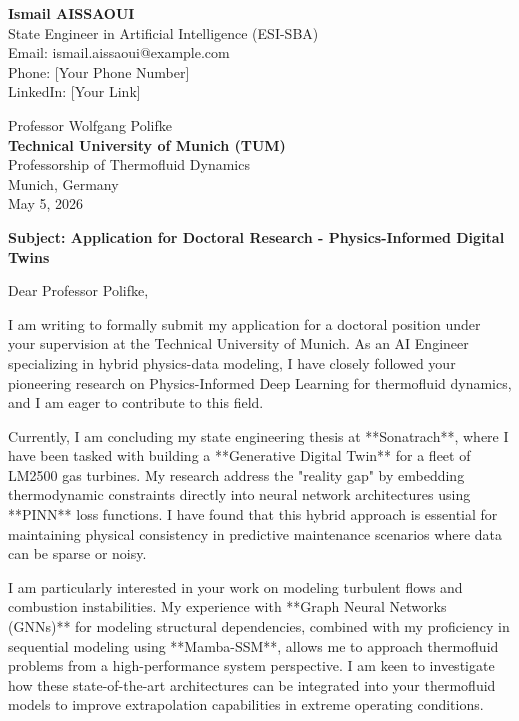 \documentclass[11pt,a4paper]{article}
\begin{document}
\noindent \textbf{Ismail AISSAOUI} \\
State Engineer in Artificial Intelligence (ESI-SBA) \\
Email: ismail.aissaoui@example.com \\
Phone: [Your Phone Number] \\
LinkedIn: [Your Link]

\bigskip

\begin{flushright}
    Professor Wolfgang Polifke \\
    \textbf{Technical University of Munich (TUM)} \\
    Professorship of Thermofluid Dynamics \\
    Munich, Germany \\
    \medskip
    May 5, 2026
\end{flushright}

\bigskip

\noindent \textbf{Subject: Application for Doctoral Research - Physics-Informed Digital Twins}

\bigskip

Dear Professor Polifke,

I am writing to formally submit my application for a doctoral position under your supervision at the Technical University of Munich. As an AI Engineer specializing in hybrid physics-data modeling, I have closely followed your pioneering research on Physics-Informed Deep Learning for thermofluid dynamics, and I am eager to contribute to this field.

Currently, I am concluding my state engineering thesis at **Sonatrach**, where I have been tasked with building a **Generative Digital Twin** for a fleet of LM2500 gas turbines. My research address the "reality gap" by embedding thermodynamic constraints directly into neural network architectures using **PINN** loss functions. I have found that this hybrid approach is essential for maintaining physical consistency in predictive maintenance scenarios where data can be sparse or noisy.

I am particularly interested in your work on modeling turbulent flows and combustion instabilities. My experience with **Graph Neural Networks (GNNs)** for modeling structural dependencies, combined with my proficiency in sequential modeling using **Mamba-SSM**, allows me to approach thermofluid problems from a high-performance system perspective. I am keen to investigate how these state-of-the-art architectures can be integrated into your thermofluid models to improve extrapolation capabilities in extreme operating conditions.
\end{document}
